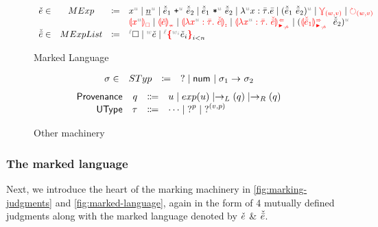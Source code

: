 \begin{figure}
    \[
    \begin{array}{lclll}
    \ECMV \in & MExp & \coloneqq &
        \var{x}
        \mid \num
        \mid \plus{\ELMV_1}{\ELMV_2}
        \mid \mult{\ELMV_1}{\ELMV_2}
        \mid \lam{x}{\TLMV}{\ELV}
        \mid \app{\ELMV_1}{\ELMV_2}
        \mid \multiref
        \mid \uniref \\ 
        & & & \ECFree{\var{x}} 
        \mid \incontype
        \mid \lamasc
        \mid \lamanamarr
        \mid \apsynmarr \\ 
     \ELMV \in & MExpList & \coloneqq &
        \ehole
        \mid \lexp{\ECMV}
        \mid \conflict{\ECMV} \\
    \end{array}
    \]
    \centering
    \caption{Marked Language}
    \label{fig:marked-language}
\end{figure}

\begin{figure}
    \[
    \begin{array}{lclll}
    \sigma \in & STyp & \coloneqq & 
        \TUnknown
        \mid \tNum{}
        \mid \starrow \\
    \end{array}
    \]
    \judgbox{\graphErase{\TLMV} = \sigma}
    \[\begin{array}{rrcl}
        {\normalfont\textsf{Provenance}} & q & \Coloneqq & u \mid exp(u) \mid \rightarrow_L(q) \mid \rightarrow_R(q)\\
        {\normalfont\textsf{UType}}  & \tau  & \Coloneqq & \dots \mid \operatorname{?}^{p} \mid \operatorname{?}^{(v,p)}\\
    \end{array}\]
    \centering
    \caption{Other machinery}
    \label{fig:marking-machinery}
\end{figure}



\subsubsection{The marked language}
\label{sub:marked-lang}
Next, we introduce the heart of the marking machinery in \autoref{fig:marking-judgments} and \autoref{fig:marked-language}, again in the form of 4 mutually defined judgments along with the marked language denoted by $\check{e}$ \& $\check{\bar{e}}$. 

